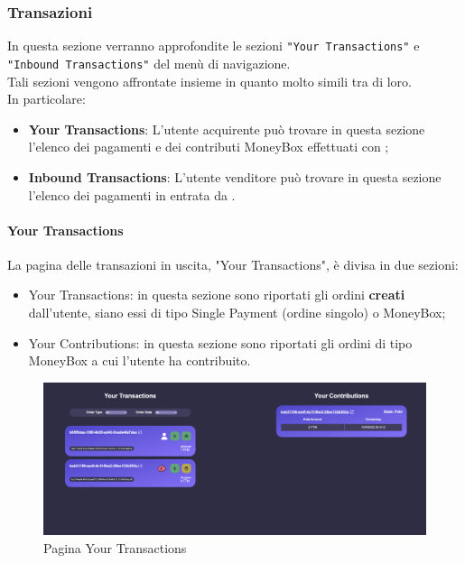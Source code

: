         \subsubsection{Transazioni}
        In questa sezione verranno approfondite le sezioni \texttt{"Your Transactions"} e \texttt{"Inbound Transactions"} del menù di navigazione.\\
        Tali sezioni vengono affrontate insieme in quanto molto simili tra di loro.\\
        In particolare:
        \begin{itemize}
            \item \textbf{Your Transactions}: L'utente acquirente può trovare in questa sezione l'elenco dei pagamenti e dei contributi MoneyBox effettuati con \projectName{};
            \item \textbf{Inbound Transactions}: L'utente venditore può trovare in questa sezione l'elenco dei pagamenti in entrata da \projectName{}.
        \end{itemize}
        \paragraph{Your Transactions}
        La pagina delle transazioni in uscita, "Your Transactions", è divisa in due sezioni:
        \begin{itemize}
            \item Your Transactions: in questa sezione sono riportati gli ordini \textbf{creati} dall'utente, siano essi di tipo Single Payment (ordine singolo) o MoneyBox;
            \item Your Contributions: in questa sezione sono riportati gli ordini di tipo MoneyBox a cui l'utente ha contribuito.
        \end{itemize}
        \begin{figure}[H]
        \centering
        \includegraphics[scale=0.2]{immagini/Transaction/YourTransaction.png}
        \caption{Pagina Your Transactions}
        \end{figure}
